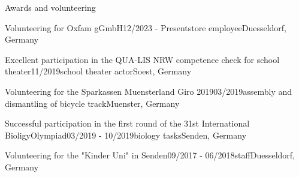 \documentclass[
	11pt, %
]{resume} %
\begin{document}

\begin{rSection}{Awards and volunteering}

	\begin{rSubsection}{Volunteering for Oxfam gGmbH}{12/2023 - Present}{store employee}{Duesseldorf, Germany}
		\item[]
	\end{rSubsection}
	\begin{rSubsection}{Excellent participation in the QUA-LIS NRW competence check for school theater}{11/2019}{school theater actor}{Soest, Germany}
		\item[]
	\end{rSubsection}
	\begin{rSubsection}{Volunteering for the Sparkassen Muensterland Giro 2019}{03/2019}{assembly and dismantling of bicycle track}{Muenster, Germany}
		\item[]
	\end{rSubsection}
	\begin{rSubsection}{Successful participation in the first round of the 31st International BioligyOlympiad}{03/2019 - 10/2019}{biology tasks}{Senden, Germany}
		\item[]
	\end{rSubsection}
	\begin{rSubsection}{Volunteering for the "Kinder Uni" in Senden}{09/2017 - 06/2018}{staff}{Duesseldorf, Germany}
		\item[]
	\end{rSubsection}

\end{rSection}

\end{document}
